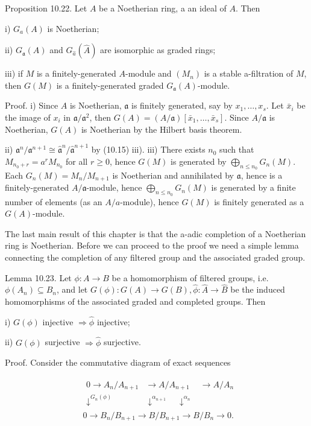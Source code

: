 \documentclass{standalone}
\theoremstyle{definition}
\theoremstyle{remark}
\begin{document}
Proposition 10.22. Let $A$ be a Noetherian ring, a an ideal of $A$. Then

i) $G_{a}(A)$ is Noetherian;

ii) $G_{\mathfrak{a}}(A)$ and $G_{\hat{a}}(\hat{A})$ are isomorphic as graded rings;

iii) if $M$ is a finitely-generated $A$-module and $\left(M_{n}\right)$ is a stable a-filtration of $M$, then $G(M)$ is a finitely-generated graded $G_{\mathfrak{a}}(A)$-module.

Proof. i) Since $A$ is Noetherian, $\mathfrak{a}$ is finitely generated, say by $x_{1}, \ldots, x_{s}$. Let $\bar{x}_{i}$ be the image of $x_{i}$ in $\mathfrak{a} / \mathfrak{a}^{2}$, then $G(A)=(A / \mathfrak{a})\left[\bar{x}_{1}, \ldots, \bar{x}_{s}\right]$. Since $A / \mathfrak{a}$ is Noetherian, $G(A)$ is Noetherian by the Hilbert basis theorem.

ii) $\mathfrak{a}^{n} / \mathfrak{a}^{n+1} \cong \hat{\mathfrak{a}}^{n} / \hat{\mathfrak{a}}^{n+1}$ by (10.15) iii). iii) There exists $n_{0}$ such that $M_{n_{0}+r}=a^{r} M_{n_{0}}$ for all $r \geqslant 0$, hence $G(M)$ is generated by $\bigoplus_{n \leqslant n_{0}} G_{n}(M)$. Each $G_{n}(M)=M_{n} / M_{n+1}$ is Noetherian and annihilated by $\mathfrak{a}$, hence is a finitely-generated $A / \mathfrak{a}$-module, hence $\bigoplus_{n \leqslant n_{0}} G_{n}(M)$ is generated by a finite number of elements (as an $A / a$-module), hence $G(M)$ is finitely generated as a $G(A)$-module.

The last main result of this chapter is that the a-adic completion of a Noetherian ring is Noetherian. Before we can proceed to the proof we need a simple lemma connecting the completion of any filtered group and the associated graded group.

Lemma 10.23. Let $\phi: A \rightarrow B$ be a homomorphism of filtered groups, i.e. $\phi\left(A_{n}\right) \subseteq B_{n}$, and let $G(\phi): G(A) \rightarrow G(B), \hat{\phi}: \hat{A} \rightarrow \hat{B}$ be the induced homomorphisms of the associated graded and completed groups. Then

i) $G(\phi)$ injective $\Rightarrow \hat{\phi}$ injective;

ii) $G(\phi)$ surjective $\Rightarrow \hat{\phi}$ surjective.

Proof. Consider the commutative diagram of exact sequences

\[
\begin{aligned}
& \begin{array}{ccc}
0 \rightarrow A_{n} / A_{n+1} & \rightarrow A / A_{n+1} & \rightarrow A / A_{n} \\
\downarrow^{G_{n}(\phi)} & \downarrow^{\alpha_{n+1}} \quad \downarrow^{\alpha_{n}} &
\end{array} \\
& 0 \rightarrow B_{n} / B_{n+1} \rightarrow B / B_{n+1} \rightarrow B / B_{n} \rightarrow 0 .
\end{aligned}
\]
\end{document}
